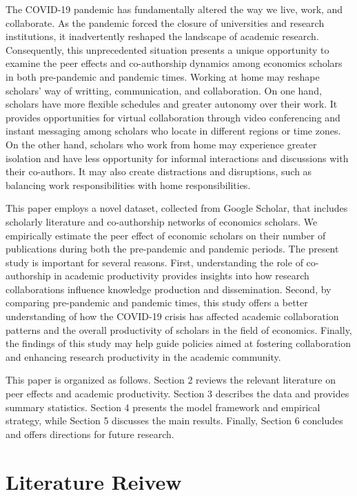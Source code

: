 The COVID-19 pandemic has fundamentally altered the way we live, work, and collaborate. As the pandemic forced the closure of universities and research institutions, it inadvertently reshaped the landscape of academic research. Consequently, this unprecedented situation presents a unique opportunity to examine the peer effects and co-authorship dynamics among economics scholars in both pre-pandemic and pandemic times. Working at home may reshape scholars' way of writting, communication, and collaboration. On one hand, scholars have more flexible schedules and greater autonomy over their work. It provides opportunities for virtual collaboration through video conferencing and instant messaging among scholars who locate in different regions or time zones. On the other hand, scholars who work from home may experience greater isolation and have less opportunity for informal interactions and discussions with their co-authors. It may also create distractions and disruptions, such as balancing work responsibilities with home responsibilities. 

This paper employs a novel dataset, collected from Google Scholar, that includes scholarly literature and co-authorship networks of economics scholars. We empirically estimate the peer effect of economic scholars on their number of publications during both the pre-pandemic and pandemic periods. The present study is important for several reasons. First, understanding the role of co-authorship in academic productivity provides insights into how research collaborations influence knowledge production and dissemination. Second, by comparing pre-pandemic and pandemic times, this study offers a better understanding of how the COVID-19 crisis has affected academic collaboration patterns and the overall productivity of scholars in the field of economics. Finally, the findings of this study may help guide policies aimed at fostering collaboration and enhancing research productivity in the academic community.

This paper is organized as follows. Section 2 reviews the relevant literature on peer effects and academic productivity. Section 3 describes the data and provides summary statistics. Section 4 presents the model framework and empirical strategy, while Section 5 discusses the main results. Finally, Section 6 concludes and offers directions for future research.

\section{Literature Reivew}

